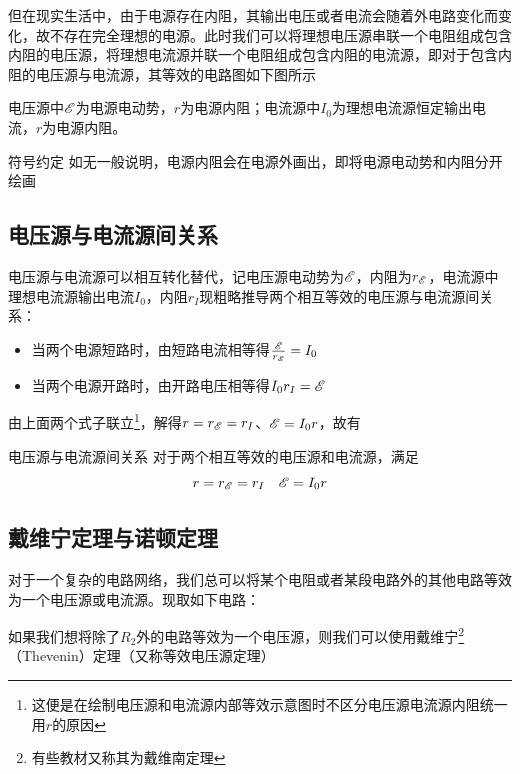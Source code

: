 但在现实生活中，由于电源存在内阻，其输出电压或者电流会随着外电路变化而变化，故不存在完全理想的电源。此时我们可以将理想电压源串联一个电阻组成包含内阻的电压源，将理想电流源并联一个电阻组成包含内阻的电流源，即对于包含内阻的电压源与电流源，其等效的电路图如下图所示



电压源中$\mathscr{E}$为电源电动势，$r$为电源内阻；电流源中$I_0$为理想电流源恒定输出电流，$r$为电源内阻。

\begin{mk}{符号约定}{}
如无一般说明，电源内阻会在电源外画出，即将电源电动势和内阻分开绘画
\end{mk}

\subsection{电压源与电流源间关系}
\label{dyydlygx}

电压源与电流源可以相互转化替代，记电压源电动势为$\mathscr{E}$，内阻为$r_{\mathscr{E}}$，电流源中理想电流源输出电流$I_0$，内阻$r_I$现粗略推导两个相互等效的电压源与电流源间关系：

\begin{itemize}
\item 当两个电源短路时，由短路电流相等得$\frac{\mathscr{E}}{r_{\mathscr{E}}} = I_0$
\item 当两个电源开路时，由开路电压相等得$I_0 r_I = \mathscr{E}$
\end{itemize}

由上面两个式子联立\footnote{这便是在绘制电压源和电流源内部等效示意图时不区分电压源电流源内阻统一用$r$的原因}，解得$r = r_{\mathscr{E}} = r_{I}$、$\mathscr{E} = I_0 r $，故有

\begin{theo}{电压源与电流源间关系}{}
对于两个相互等效的电压源和电流源，满足
$$r = r_{\mathscr{E}} = r_{I} \quad \mathscr{E} = I_0 r$$
\end{theo}

\subsection{戴维宁定理与诺顿定理}

对于一个复杂的电路网络，我们总可以将某个电阻或者某段电路外的其他电路等效为一个电压源或电流源。现取如下电路：



如果我们想将除了$R_2$外的电路等效为一个电压源，则我们可以使用戴维宁\footnote{有些教材又称其为戴维南定理}（Thevenin）定理（又称等效电压源定理）

